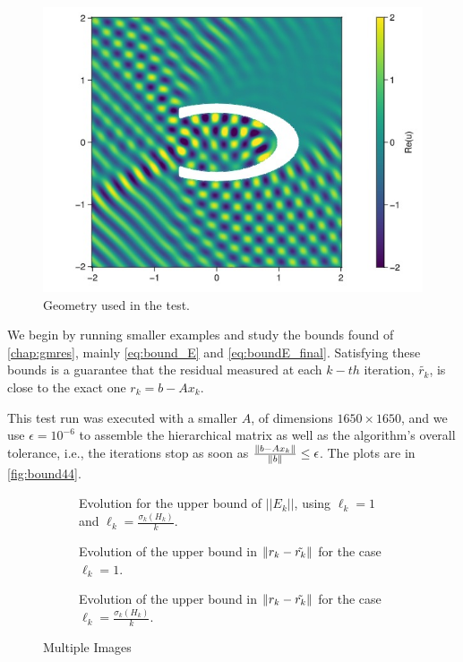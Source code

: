 \begin{figure}[h!]
    \centering
    \includegraphics[width=0.6\linewidth]{images/cavity_fig.jpg}
    \caption{Geometry used in the test.}
    \label{fig:cavity_fig}
\end{figure}


We begin by running smaller examples and study the bounds found of \autoref{chap:gmres}, mainly \ref{eq:bound_E} and \ref{eq:boundE_final}. Satisfying these bounds is a guarantee that the residual measured at each $k-th$ iteration, $\tilde{r_{k}}$, is close to the exact one $r_{k} =b-Ax_{k}$.


This test run was executed with a smaller $A$, of dimensions $1650\times 1650$, and we use $\epsilon = 10^{-6}$ to assemble the hierarchical matrix as well as the algorithm's overall tolerance, i.e., the iterations stop as soon as $\frac{\left\lVert b - Ax_{k}\right\rVert}{\left\lVert b\right\rVert} \leq \epsilon$. The plots are in \autoref{fig:bound44}.

\begin{figure}[h!]
    \centering
    \begin{subfigure}[b]{0.55\linewidth}
        
        \caption{Evolution for the upper bound of $||E_{k}||$, using $\ell_{k}=1$ and $\ell_{k}=\frac{\sigma_{k}(H_{k})}{k}$.}
    \end{subfigure}

    \begin{subfigure}[b]{0.3\linewidth}
        
        \caption{Evolution of the upper bound in $\left\lVert r_{k} - \tilde{r_{k}}\right\rVert$ for the case $\ell_{k}=1$.}
    \end{subfigure}
    \begin{subfigure}[b]{0.3\linewidth}
        
        \caption{Evolution of the upper bound in $\left\lVert r_{k} - \tilde{r_{k}}\right\rVert$ for the case $\ell_{k}=\frac{\sigma_{k}(H_{k})}{k}$.}
    \end{subfigure}
    \caption{Multiple Images}
    \label{fig:bound44}
\end{figure}


